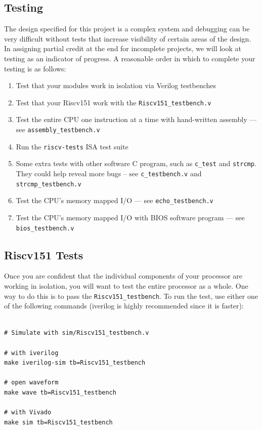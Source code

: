 \documentclass[11pt]{article}
\begin{document}
\subsection{Testing}
\label{testing}
The design specified for this project is a complex system and debugging can be very difficult without tests that increase visibility of certain areas of the design.
In assigning partial credit at the end for incomplete projects, we will look at testing as an indicator of progress.
A reasonable order in which to complete your testing is as follows:

\begin{enumerate}
  \item Test that your modules work in isolation via Verilog testbenches
  \item Test that your Riscv151 work with the \verb|Riscv151_testbench.v|
  \item Test the entire CPU one instruction at a time with hand-written assembly --- see \verb|assembly_testbench.v|
  \item Run the \verb|riscv-tests| ISA test suite
  \item Some extra tests with other software C program, such as \verb|c_test| and \verb|strcmp|. They could help reveal more bugs -- see \verb|c_testbench.v| and \verb|strcmp_testbench.v|
  \item Test the CPU's memory mapped I/O --- see \verb|echo_testbench.v|
  \item Test the CPU's memory mapped I/O with BIOS software program --- see \verb|bios_testbench.v|
\end{enumerate}

\subsection{Riscv151 Tests}

Once you are confident that the individual components of your processor are working in isolation, you will want to test the entire processor as a whole. One way to do this is to pass the \verb|Riscv151_testbench|. To run the test, use either one of the following commands (iverilog is highly recommended since it is faster):\\
\begin{verbatim}

# Simulate with sim/Riscv151_testbench.v

# with iverilog
make iverilog-sim tb=Riscv151_testbench

# open waveform
make wave tb=Riscv151_testbench

# with Vivado
make sim tb=Riscv151_testbench

\end{verbatim}
\end{document}
